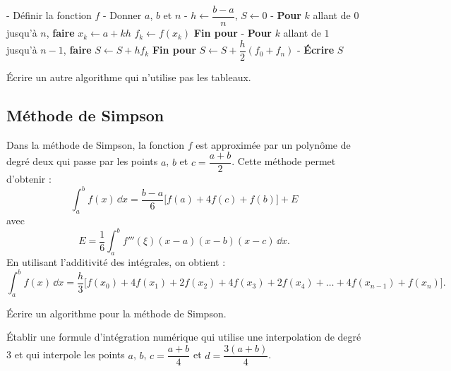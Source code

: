 \begin{algo}
  \textdegree- Définir la fonction $f$
  \textdegree- Donner $a$, $b$ et $n$
  \textdegree- $h \leftarrow \dfrac{b - a}{n}$, $S \leftarrow 0$
  \textdegree- \textbf{Pour} $k$ allant de $0$ jusqu'à $n$, \textbf{faire}
  \State \hspace{2.5em} $x_k \leftarrow a + kh$
  \State \hspace{2.5em} $f_k \leftarrow f(x_k)$
  \State \hspace{1.2em} \textbf{Fin pour}
  \textdegree- \textbf{Pour} $k$ allant de $1$ jusqu'à $n-1$, \textbf{faire}
  \State \hspace{2.5em} $S \leftarrow S + hf_k$
  \State \hspace{1.2em} \textbf{Fin pour}
  \State \hspace{1.2em} $S \leftarrow S + \dfrac{h}{2}(f_0 + f_n)$
  \textdegree- \textbf{Écrire} $S$
\end{algo}

\begin{exercice}[Exercice 4]
Écrire un autre algorithme qui n'utilise pas les tableaux.
\end{exercice}

\subsection{Méthode de Simpson}

Dans la méthode de Simpson, la fonction $f$ est approximée par un polynôme de
degré deux qui passe par les points $a$, $b$ et $c = \dfrac{a+b}{2}$. Cette
méthode permet d'obtenir :
\[
  \int_a^b f(x)\,\dd x = \frac{b - a}{6}\bigl[f(a) + 4f(c) + f(b)\bigr] + E
\]
avec
\[
  E = \frac{1}{6}\int_a^b f'''(\xi)(x - a)(x - b)(x - c)\,\dd x .
\]
En utilisant l'additivité des intégrales, on obtient :
\[
  \int_a^b f(x)\,\dd x = \frac{h}{3}\bigl[f(x_0) + 4f(x_1) + 2f(x_2) + 4f(x_3)
                         + 2f(x_4) + \dots + 4f(x_{n-1}) + f(x_n)\bigr] .
\]

\begin{exercice}[Exercice 5]
Écrire un algorithme pour la méthode de Simpson.
\end{exercice}

\begin{exercice}[Exercice 6]
Établir une formule d'intégration numérique qui utilise une interpolation de
degré 3 et qui interpole les points $a$, $b$, $c = \dfrac{a+b}{4}$ et
$d = \dfrac{3(a+b)}{4}$.
\end{exercice}

